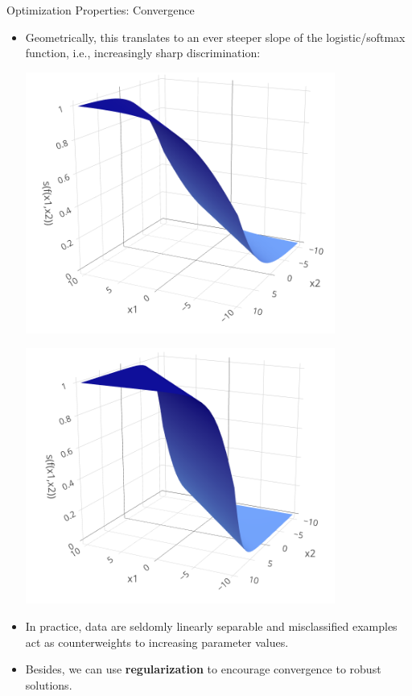 \documentclass[11pt,compress,t,notes=noshow, xcolor=table]{beamer}
\begin{document}
\begin{vbframe}{Optimization Properties: Convergence}
\framebreak

\begin{itemize}
  \small
  \item
  Geometrically, this translates to an ever steeper slope of the 
  logistic/softmax function, i.e., increasingly sharp discrimination:
  
  \vspace{0.3cm}
  \begin{minipage}[b]{0.5\textwidth}
    \includegraphics[width=0.8\textwidth]{figure/softmax_1}
  \end{minipage}%
  \begin{minipage}[b]{0.5\textwidth}
    \includegraphics[width=0.8\textwidth]{figure/softmax_2}
  \end{minipage}%
  \item In practice, data are seldomly linearly separable and misclassified 
  examples act as counterweights to increasing parameter values.
  \item Besides, we can use \textbf{regularization} to encourage convergence 
  to robust solutions.
\end{itemize}

\end{vbframe}
\end{document}
